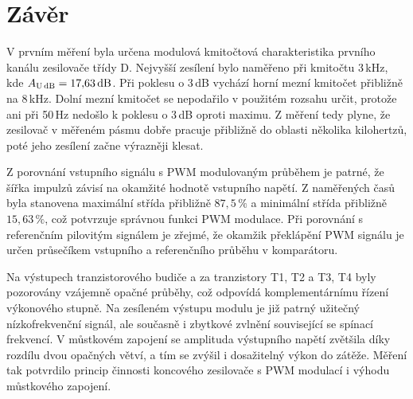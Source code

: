 \documentclass[a4paper, czech]{article}
\begin{document}
\section{Závěr}

V prvním měření byla určena modulová kmitočtová charakteristika prvního kanálu zesilovače třídy D.
Nejvyšší zesílení bylo naměřeno při kmitočtu 3\,kHz, kde $A_\text{U\,dB} = 17{,}63\,\text{dB}$.
Při poklesu o 3\,dB vychází horní mezní kmitočet přibližně na 8\,kHz.
Dolní mezní kmitočet se nepodařilo v použitém rozsahu určit, protože ani při 50\,Hz nedošlo k poklesu o 3\,dB oproti maximu.
Z měření tedy plyne, že zesilovač v měřeném pásmu dobře pracuje přibližně do oblasti několika kilohertzů, poté jeho zesílení začne výrazněji klesat.

Z porovnání vstupního signálu s PWM modulovaným průběhem je patrné, že šířka impulzů závisí na okamžité hodnotě vstupního napětí.
Z naměřených časů byla stanovena maximální střída přibližně $87{,}5\,\%$ a minimální střída přibližně $15{,}63\,\%$, což potvrzuje správnou funkci PWM modulace.
Při porovnání s referenčním pilovitým signálem je zřejmé, že okamžik překlápění PWM signálu je určen průsečíkem vstupního a referenčního průběhu v komparátoru.

Na výstupech tranzistorového budiče a za tranzistory T1, T2 a T3, T4 byly pozorovány vzájemně opačné průběhy, což odpovídá komplementárnímu řízení výkonového stupně.
Na zesíleném výstupu modulu je již patrný užitečný nízkofrekvenční signál, ale současně i zbytkové zvlnění související se spínací frekvencí.
V můstkovém zapojení se amplituda výstupního napětí zvětšila díky rozdílu dvou opačných větví, a tím se zvýšil i dosažitelný výkon do zátěže.
Měření tak potvrdilo princip činnosti koncového zesilovače s PWM modulací i výhodu můstkového zapojení.
\end{document}
